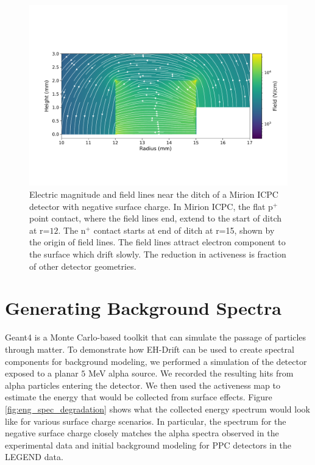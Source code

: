 \begin{figure}%
\centering
\includegraphics[trim={1cm 3cm 0cm 4.69cm},clip,width=0.99\linewidth]{ch5/figs/elect_field_lines_surface_V07647A_sc_-0.3.pdf}
\caption{Electric magnitude and field lines near the ditch of a Mirion ICPC detector with negative surface charge. In Mirion ICPC, the flat p$^+$ point contact, where the field lines end, extend to the start of ditch at r=$12$. The n$^+$ contact starts at end of ditch at r=15, shown by the origin of field lines. The field lines attract electron component to the surface which drift slowly. The reduction in activeness is fraction of other detector geometries.}
\label{ch5_fig_elect_field_lines_surface_V07647A}
\end{figure}


\section{\label{res:3} Generating Background Spectra}
Geant4 is a Monte Carlo-based toolkit that can simulate the passage of particles through matter. To demonstrate how EH-Drift can be used to create spectral components for background modeling, we performed a {\geant} simulation of the {\ponama} detector exposed to a planar $5$ MeV alpha source. We recorded the resulting hits from alpha particles entering the detector. We then used the activeness map to estimate the energy that would be collected from surface effects. Figure \ref{fig:eng_spec_degradation} shows what the collected energy spectrum would look like for various surface charge scenarios. In particular, the spectrum for the negative surface charge closely matches the alpha spectra observed in the {\MJD} experimental data and initial background modeling for PPC detectors in the LEGEND data.

